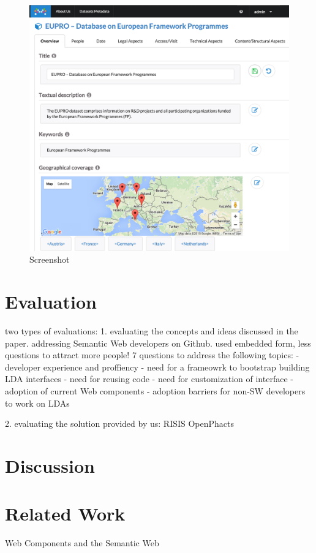 \documentclass{acm_proc_article-sp}
\begin{document}
\begin{figure}[tb]
  \includegraphics[width=.9\linewidth]{images/screenshot.jpg}
  \caption{Screenshot}
\end{figure}

\section{Evaluation}

two types of evaluations:
1. evaluating the concepts and ideas discussed in the paper.
addressing Semantic Web developers on Github. used embedded form, less questions to attract more people!
7 questions to address the following topics:
- developer experience and proffiency
- need for a frameowrk to bootstrap building LDA interfaces
- need for reusing code
- need for customization of interface
- adoption of current Web components
- adoption barriers for non-SW developers to work on LDAs

2. evaluating the solution provided by us:
RISIS
OpenPhacts

\section{Discussion}

\section{Related Work}

Web Components and the Semantic Web~\cite{pahl2011}
\end{document}
